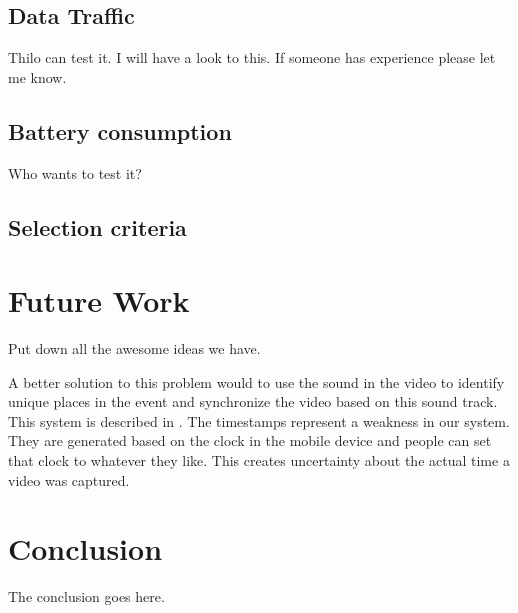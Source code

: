 \documentclass[conference]{IEEEtran}
\begin{document}
\subsection{Data Traffic} 
Thilo can test it. I will have a look to this. If someone has experience please let me know.

\subsection{Battery consumption}
Who wants to test it?

\subsection{Selection criteria}

\section{Future Work}
Put down all the awesome ideas we have.

A better solution to this problem would to use the sound in the video to identify unique places in the event and synchronize the video based on this sound track. This system is described in \cite{shrestha_automatic_2010}. 
The timestamps represent a weakness in our system. They are generated based on the clock in the mobile device and people can set that clock to whatever they like. This creates uncertainty about the actual time a video was captured.


\section{Conclusion}
The conclusion goes here.







%
\end{document}
